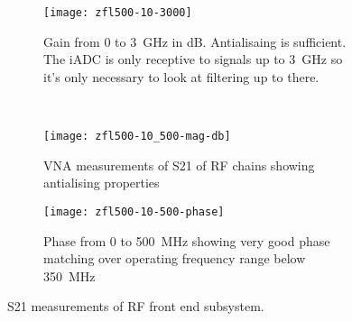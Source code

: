 \begin{figure}
  \centering
  \begin{subfigure}{\textwidth}
    \centering
    \texttt{[image: zfl500-10-3000]}
    \caption{Gain from 0 to \SI{3}{\giga\hertz} in dB. Antialisaing is sufficient. The iADC is only receptive to signals up to \SI{3}{\giga\hertz} so it's only necessary to look at filtering up to there.}
  \end{subfigure}\\[1em]
  \begin{subfigure}{\textwidth}
    \centering
    \texttt{[image: zfl500-10\_500-mag-db]}
    \caption{VNA measurements of S21 of RF chains showing antialising properties}
  \end{subfigure}
  \begin{subfigure}{\textwidth}
    \centering
    \texttt{[image: zfl500-10-500-phase]}
    \caption{Phase from 0 to \SI{500}{\mega\hertz} showing very good phase matching over operating frequency range below \SI{350}{\mega\hertz}}
  \end{subfigure}
  \caption{S21 measurements of RF front end subsystem.}
  \label{fig:rf-front-end:vna-measurements}
\end{figure}
